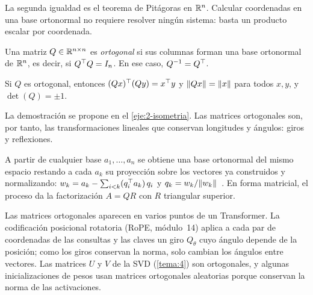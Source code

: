 La segunda igualdad es el teorema de Pitágoras en $\mathbb{R}^{n}$. Calcular coordenadas en una base ortonormal no requiere resolver ningún sistema: basta un producto escalar por coordenada.

\begin{definicion}
Una matriz $Q\in\mathbb{R}^{n\times n}$ es \emph{ortogonal} si sus columnas forman una base ortonormal de $\mathbb{R}^{n}$, es decir, si $Q^{\top} Q=I_n$. En ese caso, $Q^{-1}=Q^{\top}$.
\end{definicion}

\addtocounter{definicion}{1}%

\begin{proposicion}\label{prop:ortogonal-isometria}
Si $Q$ es ortogonal, entonces $(Qx)^{\top}(Qy)=x^{\top} y$ y $\lVert Qx\rVert=\lVert x\rVert$ para todos $x,y$, y $\det(Q)=\pm 1$.
\end{proposicion}

La demostración se propone en el \cref{eje:2-isometria}. Las matrices ortogonales son, por tanto, las transformaciones lineales que conservan longitudes y ángulos: giros y reflexiones.

\begin{observacion}
A partir de cualquier base $a_1,\dots,a_n$ se obtiene una base ortonormal del mismo espacio restando a cada $a_k$ su proyección sobre los vectores ya construidos y normalizando: $w_k=a_k-\sum_{i<k}(q_i^{\top} a_k)\,q_i$ y $q_k=w_k/\lVert w_k\rVert$~\cite[§4.4]{strang-ila}. En forma matricial, el proceso da la factorización $A=QR$ con $R$ triangular superior.
\end{observacion}

\begin{observacion}
Las matrices ortogonales aparecen en varios puntos de un Transformer. La codificación posicional rotatoria (RoPE, módulo~14) aplica a cada par de coordenadas de las consultas y las claves un giro $Q_\theta$ cuyo ángulo depende de la posición; como los giros conservan la norma, solo cambian los ángulos entre vectores. Las matrices $U$ y $V$ de la SVD (\cref{tema:4}) son ortogonales, y algunas inicializaciones de pesos usan matrices ortogonales aleatorias porque conservan la norma de las activaciones.
\end{observacion}

